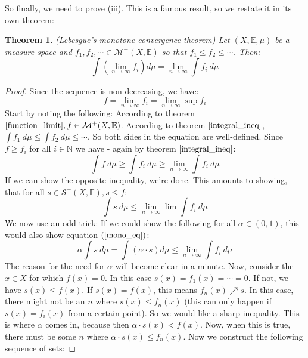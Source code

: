 \documentclass[12pt, a4paper]{article}
\newtheorem{theorem}{Theorem}[section]
\numberwithin{equation}{section}
\begin{document}
So finally, we need to prove (iii). This is a famous result, so we restate it in its own theorem:

\begin{theorem}
\label{monotone_convergence}
(Lebesgue's monotone convergence theorem) Let $(X,\mathbb{E},\mu)$ be a measure space and $f_1, f_2,\cdots\in\mathcal{M}^+(X,\mathbb{E})$ so that $f_1\le f_2\le \cdots$. Then:
\begin{equation}
\int\left(\lim_{n\rightarrow\infty}f_i\right)d\mu=\lim_{n\rightarrow\infty}\int f_i\ d\mu
\end{equation}
\end{theorem}
\begin{proof}
Since the sequence is non-decreasing, we have:
\begin{equation}
f=\lim_{n\rightarrow\infty}f_i=\lim_{n\rightarrow\infty}\sup f_i
\end{equation}
Start by noting the following: According to theorem $\ref{function_limit}, f\in\mathcal{M}^+(X,\mathbb{E})$. According to theorem $\ref{integral_ineq}$, $\int f_1\ d\mu\le\int f_2\ d\mu\le\cdots$. So both sides in the equation are well-defined. Since $f\ge f_i$ for all $i\in\mathbb{N}$ we have - again by theorem $\ref{integral_ineq}$:
\begin{equation}
\int f\ d\mu\ge\int f_i\ d\mu\ge\lim_{n\rightarrow\infty}\int f_i\ d\mu
\end{equation}
If we can show the opposite inequality, we're done. This amounts to showing, that for all $s\in\mathcal{S}^+(X,\mathbb{E}), s\le f$:
\begin{equation}
\label{mono_eq}
\int s\ d\mu\le\lim_{n\rightarrow\infty}{\lim}\int f_i\ d\mu
\end{equation} 
We now use an odd trick: If we could show the following for all $\alpha\in(0,1)$, this would also show equation $(\ref{mono_eq})$:
\begin{equation}
\alpha\int s\ d\mu=\int(\alpha\cdot s)d\mu\le\lim_{n\rightarrow\infty}\int f_i\ d\mu
\end{equation}
The reason for the need for $\alpha$ will become clear in a minute. Now, consider the $x\in X$ for which $f(x)=0$. In this case $s(x)=f_1(x)=\cdots=0$. If not, we have $s(x)\le f(x)$. If $s(x)=f(x)$, this means $f_n(x)\nearrow s$. In this case, there might not be an $n$ where $s(x)\le f_n(x)$ (this can only happen if $s(x)=f_i(x)$ from a certain point). So we would like a sharp inequality. This is where $\alpha$ comes in, because then $\alpha\cdot s(x)<f(x)$. Now, when this is true, there must be some $n$ where $\alpha\cdot s(x)\le f_n(x)$. Now we construct the following sequence of sets:

\end{proof}
\end{document}
